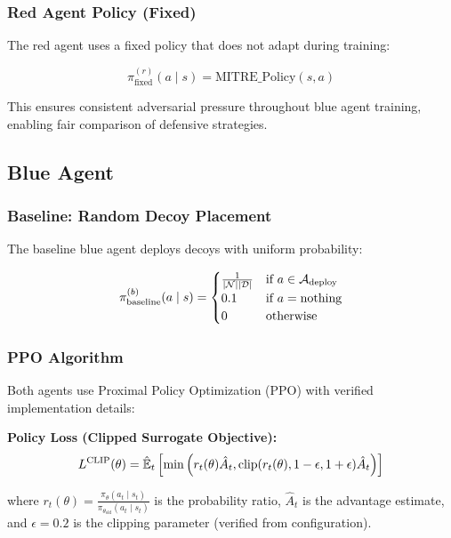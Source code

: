 \documentclass[12pt,twoside]{article}
\theoremstyle{definition}
\theoremstyle{plain}
\begin{document}
\subsubsection{Red Agent Policy (Fixed)}
The red agent uses a fixed policy that does not adapt during training:

\begin{equation}
\pi^{(r)}_{\text{fixed}}(a \mid s) = \text{MITRE\_Policy}(s, a)
\end{equation}

This ensures consistent adversarial pressure throughout blue agent training, enabling fair comparison of defensive strategies.

\subsection{Blue Agent}

\subsubsection{Baseline: Random Decoy Placement}
The baseline blue agent deploys decoys with uniform probability:

\begin{equation}
\pi^{(b)}_{\text{baseline}}(a \mid s) = \begin{cases}
\frac{1}{|\mathcal{N}||\mathcal{D}|} & \text{if } a \in \mathcal{A}_{\text{deploy}} \\
0.1 & \text{if } a = \text{nothing} \\
0 & \text{otherwise}
\end{cases}
\end{equation}

\subsubsection{PPO Algorithm}

Both agents use Proximal Policy Optimization (PPO) with verified implementation details:

\textbf{Policy Loss (Clipped Surrogate Objective):}
\begin{equation}
L^{\text{CLIP}}(\theta) = \hat{\mathbb{E}}_t\left[\min\left(r_t(\theta)\hat{A}_t, \text{clip}(r_t(\theta), 1-\epsilon, 1+\epsilon)\hat{A}_t\right)\right]
\end{equation}

where $r_t(\theta) = \frac{\pi_\theta(a_t \mid s_t)}{\pi_{\theta_{\text{old}}}(a_t \mid s_t)}$ is the probability ratio, $\hat{A}_t$ is the advantage estimate, and $\epsilon = 0.2$ is the clipping parameter (verified from configuration).
\end{document}
